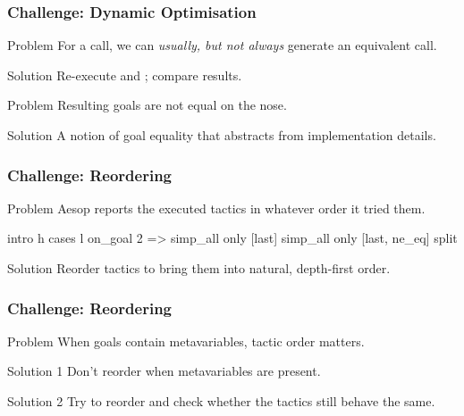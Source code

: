 \documentclass[xetex]{beamer}
\begin{document}
\begin{frame}[fragile]
  \frametitle{Challenge: Dynamic Optimisation}

  \begin{block}{Problem}
    For a  call, we can \emph{usually, but not always} generate an equivalent  call.
  \end{block}

  \pause

  \begin{block}{Solution}
    Re-execute  and ; compare results.
  \end{block}

  \pause

  \begin{block}{Problem}
    Resulting goals are not equal on the nose.
  \end{block}

  \pause

  \begin{block}{Solution}
    A notion of goal equality that abstracts from implementation details.
  \end{block}
\end{frame}

\begin{frame}[fragile]
  \frametitle{Challenge: Reordering}

  \begin{block}{Problem}
    Aesop reports the executed tactics in whatever order it tried them.

    \begin{leancode}
      intro h
      cases l
      on_goal 2 => simp_all only [last]
      simp_all only [last, ne_eq]
      split
    \end{leancode}
  \end{block}

  \pause

  \begin{block}{Solution}
    Reorder tactics to bring them into natural, depth-first order.
  \end{block}
\end{frame}

\begin{frame}
  \frametitle{Challenge: Reordering}

  \begin{block}{Problem}
    When goals contain metavariables, tactic order matters.
  \end{block}

  \pause

  \begin{block}{Solution 1}
    Don't reorder when metavariables are present.
  \end{block}

  \pause

  \begin{block}{Solution 2}
    Try to reorder and check whether the tactics still behave the same.
  \end{block}
\end{frame}
\end{document}
